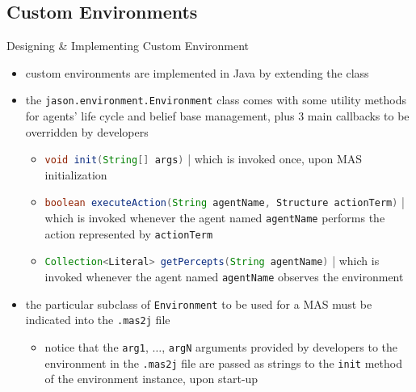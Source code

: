\documentclass[presentation]{beamer}\mode<presentation>{\usetheme{AMSBolognaFC}}
\begin{document}
\subsection{Custom Environments}

\begin{frame}[c,allowframebreaks]{Designing \& Implementing Custom Environment}
    
    \begin{itemize}
        \item custom environments are implemented in Java by extending the class
        \begin{center}
        \end{center}
    
        \vspace{.3cm}
    
        \item the \texttt{jason.environment.\alert{Environment}} class comes with some utility methods for agents' life cycle and belief base management, plus 3 main \alert{callbacks} to be overridden by developers
        \begin{itemize}
            \item \lstinline[language=Java]{void init(String[] args)} | which is invoked once, upon MAS initialization
            \item \lstinline[language=Java]{boolean executeAction(String agentName, Structure actionTerm)} | which is invoked whenever the agent named \texttt{agentName} performs the action represented by \texttt{actionTerm}
            \item \lstinline[language=Java]{Collection<Literal> getPercepts(String agentName)} | which is invoked whenever the agent named \texttt{agentName} observes the environment
        \end{itemize}
    
        \framebreak
        
        \item the particular subclass of \texttt{Environment} to be used for a MAS must be indicated into the \texttt{.mas2j} file
        
        \begin{itemize}
            \item notice that the \texttt{arg1}, $\ldots$, \texttt{argN} arguments provided by developers to the environment in the \texttt{.mas2j} file are passed \alert{as strings} to the \texttt{init} method of the environment instance, upon start-up
        \end{itemize}
        
    \end{itemize}
    
\end{frame} 
\end{document}
